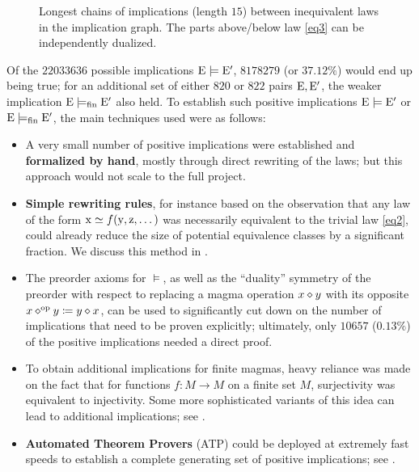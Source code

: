 \begin{figure}
{%
    }
    \caption{Longest chains of implications (length $15$) between inequivalent laws in the implication graph.  The parts above/below law \eqref{eq3} can be independently dualized. }
    \label{fig:longchain}
\end{figure}

Of the $\num{22033636}$ possible implications ${\mathrm{E}} \models {\mathrm{E}'}$, $\num{8178279}$ (or $37.12\%$) would end up being true; for an additional set of either $820$ or $822$ pairs $\mathrm{E},{\mathrm{E}'}$, the weaker implication ${\mathrm{E}} \models_{\mathrm{fin}} {\mathrm{E}'}$ also held. To establish such positive implications ${\mathrm{E}} \models {\mathrm{E}'}$ or ${\mathrm{E}} \models_{\mathrm{fin}} {\mathrm{E}'}$, the main techniques used were as follows:

\begin{itemize}
    \item A very small number of positive implications were established and \textbf{formalized by hand}, mostly through direct rewriting of the laws; but this approach would not scale to the full project.
    \item \textbf{Simple rewriting rules}, for instance based on the observation that any law of the form $\mathrm{x} \simeq f(\mathrm{y},\mathrm{z},\dots)$ was necessarily equivalent to the trivial law \eqref{eq2}, could already reduce the size of potential equivalence classes by a significant fraction. We discuss this method in .
    \item The preorder axioms for $\models$, as well as the ``duality'' symmetry of the preorder with respect to replacing a magma operation $x \diamond y$ with its opposite $x \diamond^{\mathrm{op}} y \coloneqq y \diamond x$, can be used to significantly cut down on the number of implications that need to be proven explicitly; ultimately, only $10657$ ($0.13\%$) of the positive implications needed a direct proof.
    \item To obtain additional implications for finite magmas, heavy reliance was made on the fact that for functions $f \colon M \to M$ on a finite set $M$, surjectivity was equivalent to injectivity.  Some more sophisticated variants of this idea can lead to additional implications; see .
    \item \textbf{Automated Theorem Provers} (ATP) could be deployed at extremely fast speeds to establish a complete generating set of positive implications; see .
\end{itemize}

